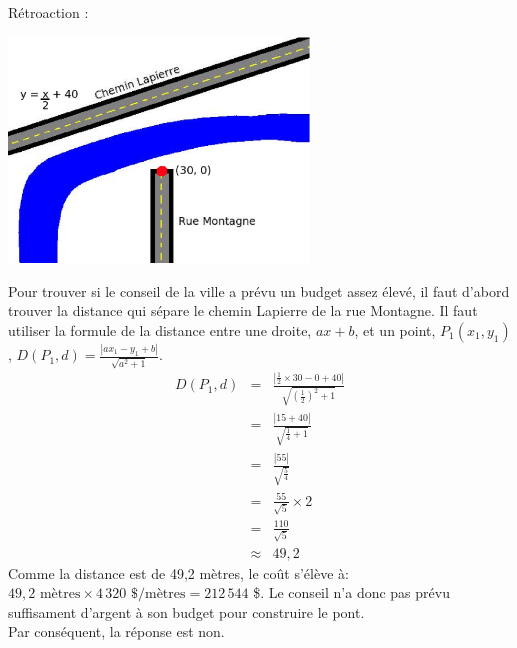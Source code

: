 \documentclass[letterpaper, 12pt]{article}
\begin{document}
R\'etroaction :\\
\begin{center}
 \includegraphics[width=8cm,bb=14 14 553 418]{Q2463.eps}
\end{center}
Pour trouver si le conseil de la ville a pr\'evu un budget assez \'elev\'e, il faut d'abord trouver la distance qui s\'epare le chemin Lapierre de la rue Montagne. Il faut utiliser la formule de la distance entre une droite, $ax+b$, et un point, $P_{1}(x_{1}, y_{1})$, $D(P_{1}, d)=\frac{|ax_{1}-y_{1}+b|}{\sqrt{a^{2}+1}}$.
\begin{eqnarray*}
 D(P_{1}, d)&=&\frac{|\frac{1}{2}\times 30-0+40|}{\sqrt{(\frac{1}{2})^{2}+1}}\\[2mm]
&=&\frac{|15+40|}{\sqrt{\frac{1}{4}+1}}\\[2mm]
&=&\frac{|55|}{\sqrt{\frac{5}{4}}}\\[2mm]
&=&\frac{55}{\sqrt{5}}\times 2\\[2mm]
&=&\frac{110}{\sqrt{5}}\\[2mm]
&\approx&49,2
\end{eqnarray*}
Comme la distance est de 49,2 m\`etres, le co\^ut s'\'el\`eve \`a: $49,2\textrm{ m\`etres} \times 4\,320\textrm{ \$/m\`etres} = 212\,544$ \$. Le conseil n'a donc pas pr\'evu suffisament d'argent \`a son budget pour construire le pont.\\
Par cons\'equent, la r\'eponse est non.\\
\end{document}
